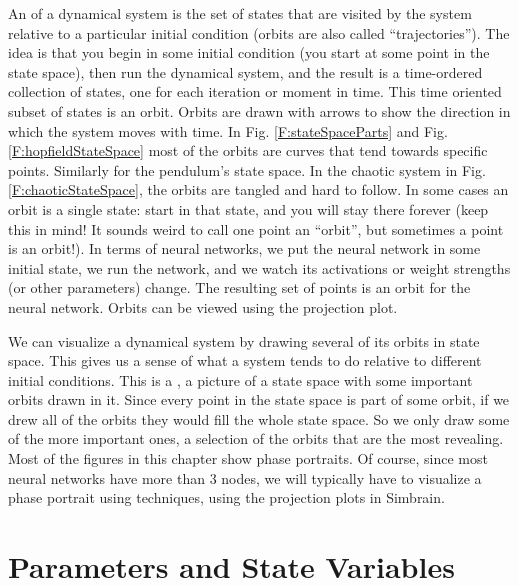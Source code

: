 An  of a dynamical system is the set of states that are visited by the system relative to a particular initial condition (orbits are also called ``trajectories''). The idea is that you begin in some initial condition (you start at some point  in the state space), then run the dynamical system, and the result is a time-ordered collection of states, one for each iteration or moment in time. This time oriented subset of states is an orbit. Orbits are drawn with arrows to show the direction in which the system moves with time. In Fig. \ref{F:stateSpaceParts} and Fig. \ref{F:hopfieldStateSpace} most of the orbits are curves that tend towards specific points. Similarly for the pendulum's state space. In the chaotic system in Fig. \ref{F:chaoticStateSpace}, the orbits are tangled and hard to follow. In some cases an orbit is a single state: start in that state, and you will stay there forever (keep this in mind! It sounds weird to call one point an ``orbit'', but sometimes a point is an orbit!). In terms of  neural networks, we put the neural network in some initial state, we run the  network, and we watch its activations or weight strengths (or other parameters) change. The resulting set of points is an orbit for the neural network. Orbits can be viewed using the projection plot.

We can visualize a dynamical system by drawing several of its orbits in  state space. This gives us a sense of what a system tends to do relative to different initial conditions. This is a  , a picture of a state space with some important orbits drawn in it. Since every point in the state space is part of some orbit, if we drew all of  the orbits they would fill the whole state space. So we only draw some of the  more important ones, a selection of the orbits that are the most revealing. Most of the figures in this chapter show phase portraits. Of course, since most neural networks have more than 3 nodes, we will  typically have to visualize a phase portrait using  techniques, using the  projection plots in Simbrain. 

\section{Parameters and State Variables}

